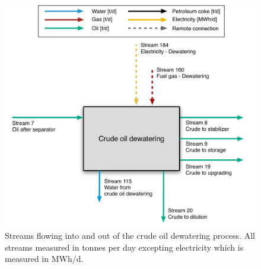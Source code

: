 \documentclass[11pt]{report}
\begin{document}
\begin{figure}
\includegraphics[width=0.85\columnwidth]{images/Crude_oil_dewatering_PF.pdf}
\caption{Streams flowing into and out of the crude oil dewatering process. All streams measured in tonnes per day excepting electricity which is measured in MWh/d.}
\label{fig:crude_oil_dewatering_PF}
\end{figure}
\end{document}
